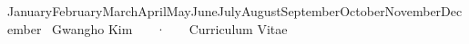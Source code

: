 \documentclass[11pt, letterpaper]{academic-cv}
\begin{document}
\makecvheader

\makecvfooter
  {\ifcase\month\or January\or February\or March\or April\or May\or June\or July\or August\or September\or October\or November\or December\fi\ \number\year}
  {Gwangho Kim ~~~·~~~ Curriculum Vitae}
  {\thepage}




%


%



\par{}\par
%
%
%

\end{document}
